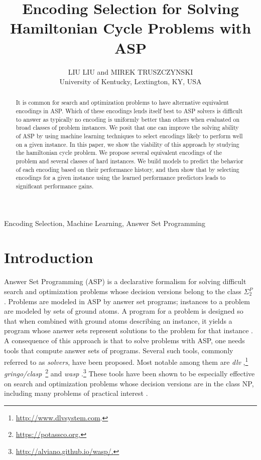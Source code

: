 \documentclass{new_tlp}
\title[Theory and Practice of Logic Programming]
        {Encoding Selection for Solving Hamiltonian Cycle Problems with ASP}
\author[Liu Liu and Mirek Truszczynki]
 {LIU LIU and MIREK TRUSZCZYNSKI\\
 University of Kentucky, Lextington, KY, USA\\
 \email{liu.liu@uky.edu and mirek@uky.edu}}
\begin{document}
\nocite{*}%


\label{firstpage}

\maketitle

  \begin{abstract}
It is common for search and optimization problems to have alternative equivalent encodings in ASP. 
Which of these encodings lends itself best to ASP solvers is 
difficult to answer as typically no encoding is uniformly better 
than others when evaluated on broad classes of problem instances.
We posit that one can improve the solving ability of ASP by using machine 
learning techniques to select encodings likely to perform well on 
a given instance. In this paper, we show the viability of this approach by 
studying the hamiltonian cycle problem. We propose several equivalent 
encodings of the problem and several classes of hard instances. We build models to 
predict the behavior of each encoding based on their performance history, 
and then show that by selecting encodings for a given instance 
using the learned performance predictors leads to significant performance gains.
    
  \end{abstract}

  \begin{keywords}
    Encoding Selection, Machine Learning, Answer Set Programming
  \end{keywords}


\section{Introduction}
Answer Set Programming (ASP) is a declarative formalism for solving difficult 
search and optimization problems whose decision versions belong to the 
class $\Sigma_2^P$ \cite{BrewkaET11}. Problems are modeled in ASP by answer 
set programs; instances to a problem are modeled by sets of ground atoms. 
A program for a problem is designed so that when combined with ground atoms 
describing an instance, it yields a program whose answer sets represent
solutions to the problem for that instance \cite{mt99}. A consequence of this
approach is that to solve problems with ASP, one needs tools that compute 
answer sets of programs. Several such tools, commonly referred to as 
\emph{solvers}, have been proposed. Most notable among them are \textit{dlv} 
\cite{LeonePFEGPS06},\footnote{\url{http://www.dlvsystem.com}.} 
\textit{gringo/clasp}~\cite{potsdamBook}\footnote{\url{https://potassco.org.}} 
and \textit{wasp} \cite{AlvianoDFLR13}.\footnote{\url{http://alviano.github.io/wasp/.}} 
These tools have been shown to be especially effective on search and 
optimization problems whose decision versions are in the class NP, including 
many problems of practical interest \cite{GebserMR17,ErdemGL16}. 
\end{document}
